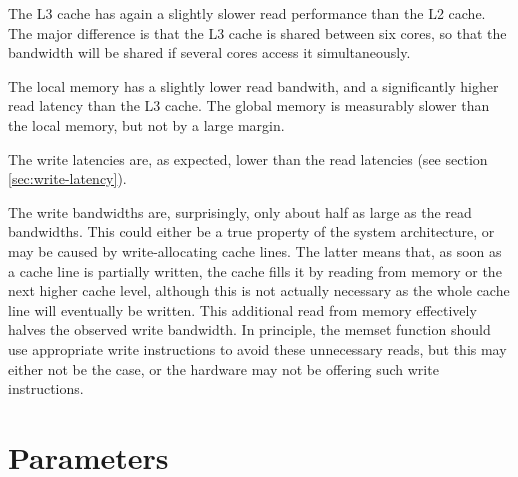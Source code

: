 The L3 cache has again a slightly slower read performance than the L2
cache. The major difference is that the L3 cache is shared between six
cores, so that the bandwidth will be shared if several cores access it
simultaneously.

The local memory has a slightly lower read bandwith, and a
significantly higher read latency than the L3 cache. The global memory
is measurably slower than the local memory, but not by a large margin.

The write latencies are, as expected, lower than the read latencies
(see section \ref{sec:write-latency}).

The write bandwidths are, surprisingly, only about half as large as
the read bandwidths. This could either be a true property of the
system architecture, or may be caused by write-allocating cache lines.
The latter means that, as soon as a cache line is partially written,
the cache fills it by reading from memory or the next higher cache
level, although this is not actually necessary as the whole cache line
will eventually be written. This additional read from memory
effectively halves the observed write bandwidth. In principle, the
memset function should use appropriate write instructions to avoid
these unnecessary reads, but this may either not be the case, or the
hardware may not be offering such write instructions.



\begin{thebibliography}{9}
  
  
  
  
\end{thebibliography}




\section{Parameters} 


